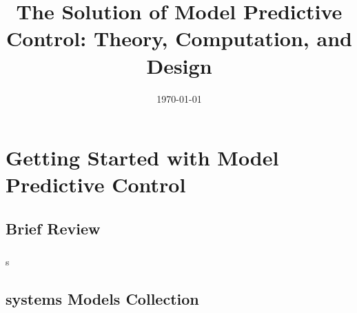 \documentclass[10pt,a4paper,draft]{report}
\title{The Solution of Model Predictive Control: Theory, Computation, and Design}
\author{}
\date{\today}
\begin{document}
\maketitle

\chapter{Getting Started with Model Predictive Control}
\section{Brief Review}
\paragraph{}
s


\section{systems Models Collection}
\end{document}
